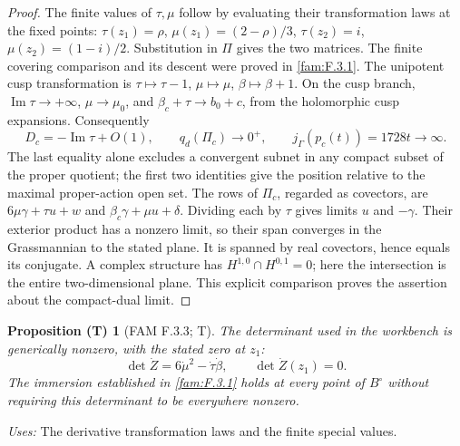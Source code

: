 \documentclass[11pt,a4paper]{article}
\theoremstyle{plain}
\newtheorem{proposition}[theorem]{Proposition (T)}
\theoremstyle{definition}
\begin{document}
\begin{proof}
The finite values of $\tau,\mu$ follow by evaluating their transformation
laws at the fixed points: $\tau(z_1)=\rho$,
$\mu(z_1)=(2-\rho)/3$, $\tau(z_2)=i$,
$\mu(z_2)=(1-i)/2$.  Substitution in $\Pi$ gives the two matrices.
The finite covering comparison and its descent were proved in \ref{fam:F.3.1}.
The unipotent cusp transformation is
$\tau\mapsto\tau-1$, $\mu\mapsto\mu$, $\beta\mapsto\beta+1$.
On the cusp branch, $\operatorname{Im}\tau\to+\infty$,
$\mu\to\mu_0$, and $\beta_c+\tau\to b_0+c$, from the holomorphic
cusp expansions.  Consequently
\[
 D_c=-\operatorname{Im}\tau+O(1),\qquad
 q_d(\Pi_c)\longrightarrow0^+,
 \qquad j_\Gamma(p_c(t))=1728t\longrightarrow\infty.
\]
The last equality alone excludes a convergent subnet in any compact
subset of the proper quotient; the first two identities give the
position relative to the maximal proper-action open set.
The rows of $\Pi_c$, regarded as covectors, are
$6\mu\gamma+\tau u+w$ and $\beta_c\gamma+\mu u+\delta$.
Dividing each by $\tau$ gives limits $u$ and $-\gamma$.
Their exterior product has a nonzero limit, so their span converges
in the Grassmannian to the stated plane.  It is spanned by real
covectors, hence equals its conjugate.  A complex structure has
$H^{1,0}\cap H^{0,1}=0$; here the intersection is the entire
two-dimensional plane.  This explicit comparison proves the assertion
about the compact-dual limit.
\end{proof}

\begin{proposition}[FAM F.3.3; T]\label{fam:F.3.3}
The determinant used in the workbench is generically nonzero, with
the stated zero at $z_1$:
\[
 \det\dot Z=6\dot\mu^2-\dot\tau\dot\beta,\qquad
 \det\dot Z(z_1)=0.
\]
The immersion established in \ref{fam:F.3.1} holds at every point of $B^\circ$
without requiring this determinant to be everywhere nonzero.
\end{proposition}
\noindent\emph{Uses:} The derivative transformation laws and the finite special values.\par
\end{document}
